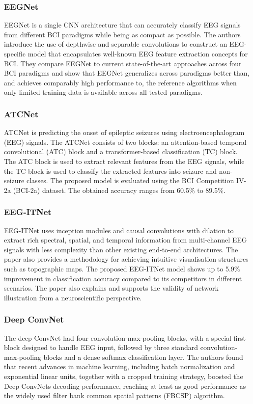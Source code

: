 \documentclass[runningheads]{llncs}
\begin{document}
\subsubsection{EEGNet}
EEGNet is a single CNN architecture that can accurately classify EEG signals from different BCI paradigms while being as compact as possible. The authors introduce the use of depthwise and separable convolutions to construct an EEG-specific model that encapsulates well-known EEG feature extraction concepts for BCI. They compare EEGNet to current state-of-the-art approaches across four BCI paradigms and show that EEGNet generalizes across paradigms better than, and achieves comparably high performance to, the reference algorithms when only limited training data is available across all tested paradigms.

\subsubsection{ATCNet}
ATCNet is predicting the onset of epileptic seizures using electroencephalogram (EEG) signals. The ATCNet consists of two blocks: an attention-based temporal convolutional (ATC) block and a transformer-based classification (TC) block. The ATC block is used to extract relevant features from the EEG signals, while the TC block is used to classify the extracted features into seizure and non-seizure classes. The proposed model is evaluated using the BCI Competition IV-2a (BCI-2a) dataset. The obtained accuracy ranges from 60.5\% to 89.5\%.


\subsubsection{EEG-ITNet}
EEG-ITNet uses inception modules and causal convolutions with dilation to extract rich spectral, spatial, and temporal information from multi-channel EEG signals with less complexity than other existing end-to-end architectures. The paper also provides a methodology for achieving intuitive visualisation structures such as topographic maps. The proposed EEG-ITNet model shows up to 5.9\% improvement in classification accuracy compared to its competitors in different scenarios. The paper also explains and supports the validity of network illustration from a neuroscientific perspective. 

\subsubsection{Deep ConvNet}
The deep ConvNet had four convolution-max-pooling blocks, with a special first block designed to handle EEG input, followed by three standard convolution-max-pooling blocks and a dense softmax classification layer. The authors found that recent advances in machine learning, including batch normalization and exponential linear units, together with a cropped training strategy, boosted the Deep ConvNets decoding performance, reaching at least as good performance as the widely used filter bank common spatial patterns (FBCSP) algorithm.
\end{document}
